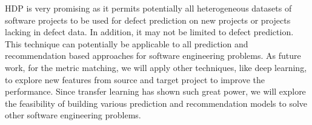 
HDP is very promising as it permits potentially all heterogeneous datasets
of software projects to be used for defect prediction on new projects or
projects lacking in defect data.
In addition, it may not be limited to defect prediction. This technique can
potentially be applicable to all prediction and recommendation based approaches
for software engineering problems.
As future work, for the metric
matching, we will apply other techniques, like deep learning, to explore new features from source and target project to improve the performance. Since transfer learning has shown such great power, we will explore the feasibility of building various prediction and recommendation models to solve other software engineering problems. 





